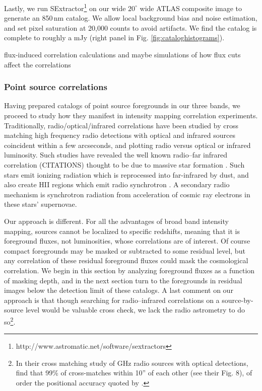 \documentclass[preprint]{aastex}
\begin{document}
Lastly, we run SExtractor\footnote{http://www.astromatic.net/software/sextractors} \citep{sextractor} on our wide $20^\circ$ wide ATLAS composite image to generate an 850\,nm catalog. We allow local background bias and noise estimation, and set pixel saturation at 20,000 counts to avoid artifacts. We find the catalog is complete to roughly a mJy (right panel in Fig. \ref{fig:cataloghistograms}). 





flux-induced correlation calculations and maybe simulations of how flux cuts affect the correlations

\subsubsection{Point source correlations}

Having prepared catalogs of point source foregrounds in our three bands, we proceed to study how they manifest in intensity mapping correlation experiments. Traditionally, radio/optical/infrared correlations have been studied by cross matching high frequency radio detections with optical and infrared sources coincident within a few arcseconds, and plotting radio versus optical or infrared luminosity. Such studies have revealed the well known radio--far infrared correlation (CITATIONS) thought to be due to massive star formation \citep[e.g.][]{helou85,dejong85,yun01,xu94}. Such stars emit ionizing radiation which is reprocessed into far-infrared by dust, and also create HII regions which emit radio synchrotron \citep{xu94}. A secondary radio mechanism is synchrotron radiation from acceleration of cosmic ray electrons in these stars' supernovae. 

Our approach is different. For all the advantages of broad band intensity mapping, sources cannot be localized to specific redshifts, meaning that it is foreground fluxes, not luminosities, whose correlations are of interest. Of course compact foregrounds may be masked or subtracted to some residual level, but any correlation of these residual foreground fluxes could mask the cosmological correlation. We begin in this section by analyzing foreground fluxes as a function of masking depth, and in the next section turn to the foregrounds in residual images below the detection limit of these catalogs. A last comment on our approach is that though searching for radio--infrared correlations on a source-by-source level would be valuable cross check, we lack the radio astrometry to do so\footnote{In their cross matching study of GHz radio sources with optical detections, \citep{mcmahon02} find that 99\% of cross-matches within 10'' of each other (see their Fig. 8), of order the positional accuracy quoted by \citet{PattiCatalog1}.}. 
\end{document}
